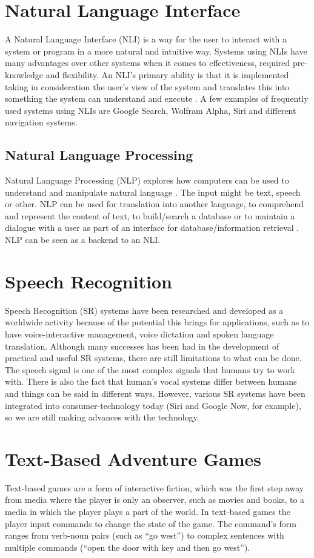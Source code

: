 \section{Natural Language Interface}
A Natural Language Interface (NLI) is a way for the user to interact with a system or program in a more natural and intuitive way. Systems using NLIs have many advantages over other systems when it comes to effectiveness, required pre-knowledge and flexibility. An NLI's primary ability is that it is implemented taking in consideration the user's view of the system and translates this into something the system can understand and execute \citep{Hend}. A few examples of frequently used systems using NLIs are Google Search, Wolfram Alpha, Siri and different navigation systems.

\subsection{Natural Language Processing}
Natural Language Processing (NLP) explores how computers can be used to understand and manipulate natural language \citep{Gobi}. The input might be text, speech or other. NLP can be used for translation into another language, to comprehend and represent the content of text, to build/search a database or to maintain a dialogue with a user as part of an interface for database/information retrieval \citep{Allen}. NLP can be seen as a backend to an NLI.

\section{Speech Recognition}
Speech Recognition (SR) systems have been researched and developed as a worldwide activity because of the potential this brings for applications, such as to have voice-interactive management, voice dictation and spoken language translation. Although many successes has been had in the development of practical and useful SR systems, there are still limitations to what can be done. The speech signal is one of the most complex signals that humans try to work with. There is also the fact that human’s vocal systems differ between humans and things can be said in different ways. However, various SR systems have been integrated into consumer-technology today (Siri and Google Now, for example), so we are still making advances with the technology. \citep{SR}

\section{Text-Based Adventure Games}
Text-based games are a form of interactive fiction, which was the first step away from media where the player is only an observer, such as movies and books, to a media in which the player plays a part of the world. In text-based games the player input commands to change the state of the game. The command's form ranges from verb-noun pairs (such as ``go west'') to complex sentences with multiple commands (``open the door with key and then go west'').\citep[page 54-55]{Sweet}

